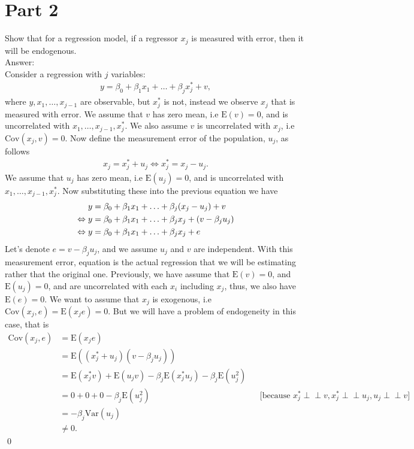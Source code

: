 \documentclass[10pt]{article}
\newcommand{\E}{\text{E}}
\newcommand{\V}{\text{Var}}
\newcommand{\cov}{\text{Cov}}
\newcommand{\indep}{\perp \!\!\! \perp}
\begin{document}
\section*{Part 2}
Show that for a regression model, if a regressor $x_j$ is measured with error, then it will be endogenous.
\\ Answer: \\
Consider a regression with $j$ variables:
\begin{align}
    y=\beta_0+\beta_1x_1+\ldots+\beta_jx_j^*+v,
\end{align}
where $y,x_1,\ldots,x_{j-1}$ are observable, but $x_j^*$ is not, instead we observe $x_j$ that is measured with error. We assume that $v$ has zero mean, i.e $\E(v)=0$, and is uncorrelated with $x_1,\ldots,x_{j-1},x_j^*$. We also assume $v$ is uncorrelated with $x_j$, i.e $\cov(x_j,v)=0$. Now define the measurement error of the population, $u_j$, as follows
\begin{align}
x_j=x_j^*+u_j\Leftrightarrow x_j^*=x_j-u_j.
\end{align}
We assume that $u_j$ has zero mean, i.e $\E(u_j)=0$, and is uncorrelated with $x_1,\ldots,x_{j-1},x_j^*$. Now substituting these into the previous equation we have
\begin{align}
    y&=\beta_0+\beta_1x_1+\ldots+\beta_j(x_j-u_j)+v \notag \\
    \Leftrightarrow y&=\beta_0+\beta_1x_1+\ldots+\beta_jx_j+(v-\beta_ju_j) \notag \\
    \Leftrightarrow y&=\beta_0+\beta_1x_1+\ldots+\beta_jx_j+e
\end{align}
Let's denote $e=v-\beta_ju_j$, and we assume $u_j$ and $v$ are independent. With this measurement error, equation is the actual regression that we will be estimating rather that the original one. Previously, we have assume that $\E(v)=0$, and $\E(u_j)=0$, and are uncorrelated with each $x_i$ including $x_j$, thus, we also have $\E(e)=0$. We want to assume that $x_j$ is exogenous, i.e $\cov(x_j,e)=\E(x_je)=0$. But we will have a problem of endogeneity in this case, that is
\begin{align*}
    \cov(x_j,e)&=\E(x_je)\\
    &=\E((x_j^*+u_j)(v-\beta_ju_j))\\
    &=\E(x_j^*v)+\E(u_jv)-\beta_j\E(x_j^*u_j)-\beta_j\E(u_j^2)\\
    &=0+0+0-\beta_j\E(u_j^2)& &\text{[because }x_j^*\indep v,x_j^*\indep u_j, u_j\indep v]\\
    &=-\beta_j\V(u_j) \\
    &\neq 0.
\end{align*}\qed
\end{document}
